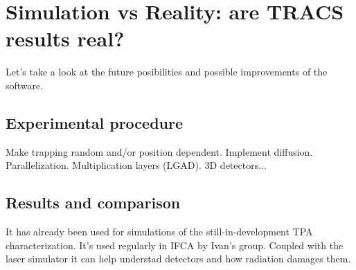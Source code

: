 \chapter{Simulation vs Reality: are TRACS results real?}

Let's take a look at the future posibilities and possible improvements of the software.

\section{Experimental procedure} %
\label{sec:future_improvements}

Make trapping random and/or position dependent. Implement diffusion. Parallelization. Multiplication layers (LGAD). 3D detectors...


\section{Results and comparison} %
\label{sec:future_proyection}

It has already been used for simulations of the still-in-development TPA characterization. It's used regularly in IFCA by Ivan's group. Coupled with the laser simulator it can help understad detectors and how radiation damages them.

